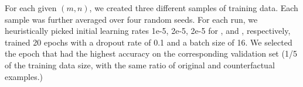 For each given $(m,n)$, we created three different samples of training data.
Each sample was further averaged over four random seeds.
For each run, we heuristically picked initial learning rates 1e-5, 2e-5, 2e-5 for \sst, \nli and \qqp, respectively, trained 20 epochs with a dropout rate of 0.1 and a batch size of 16. 
We selected the epoch that had the highest accuracy on the corresponding validation set (1/5 of the training data size, with the same ratio of original and counterfactual examples.)

